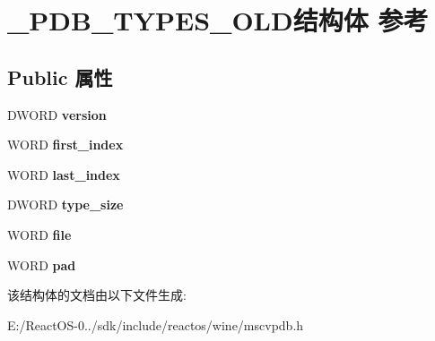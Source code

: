 \hypertarget{struct___p_d_b___t_y_p_e_s___o_l_d}{}\section{\+\_\+\+P\+D\+B\+\_\+\+T\+Y\+P\+E\+S\+\_\+\+O\+L\+D结构体 参考}
\label{struct___p_d_b___t_y_p_e_s___o_l_d}
\subsection*{Public 属性}
\begin{DoxyCompactItemize}
\item 
\mbox{\label{struct___p_d_b___t_y_p_e_s___o_l_d_a9309cbd18d16bf4e0ceca5836cedf822}} 
D\+W\+O\+RD {\bfseries version}
\item 
\mbox{\label{struct___p_d_b___t_y_p_e_s___o_l_d_afa6947cd978fb45b1c888173075fb5fd}} 
W\+O\+RD {\bfseries first\+\_\+index}
\item 
\mbox{\label{struct___p_d_b___t_y_p_e_s___o_l_d_ae025b1f210d29d7b2cd04daf9181d794}} 
W\+O\+RD {\bfseries last\+\_\+index}
\item 
\mbox{\label{struct___p_d_b___t_y_p_e_s___o_l_d_a283adf201d8968c491c03c1f784009d5}} 
D\+W\+O\+RD {\bfseries type\+\_\+size}
\item 
\mbox{\label{struct___p_d_b___t_y_p_e_s___o_l_d_a76b53f30383d244dc1ed9f3fdd35fc26}} 
W\+O\+RD {\bfseries file}
\item 
\mbox{\label{struct___p_d_b___t_y_p_e_s___o_l_d_a3e522f80c65ccda1aa1efe565cf27fb4}} 
W\+O\+RD {\bfseries pad}
\end{DoxyCompactItemize}


该结构体的文档由以下文件生成\+:\begin{DoxyCompactItemize}
\item 
E\+:/\+React\+O\+S-\/0../sdk/include/reactos/wine/mscvpdb.\+h\end{DoxyCompactItemize}
